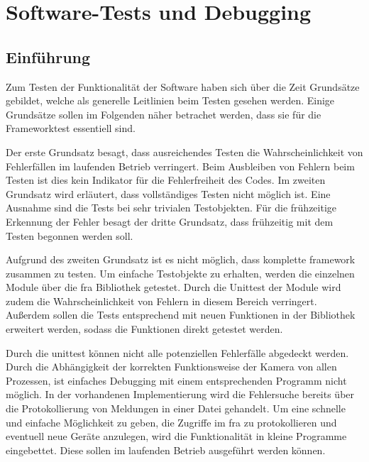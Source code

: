 
\chapter{Software-Tests und Debugging} \label{sec:test}

\section{Einführung}
Zum Testen der Funktionalität der Software haben sich über die Zeit Grundsätze gebildet, welche als generelle Leitlinien beim Testen gesehen werden. \citep[S. 53]{spillner2005basiswissen}
Einige Grundsätze sollen im Folgenden näher betrachet werden, dass sie für die Frameworktest essentiell sind. 

Der erste Grundsatz besagt, dass ausreichendes Testen die Wahrscheinlichkeit von Fehlerfällen im laufenden Betrieb verringert. Beim Ausbleiben von Fehlern beim Testen ist dies kein Indikator für die Fehlerfreiheit des Codes.
Im zweiten Grundsatz wird erläutert, dass vollständiges Testen nicht möglich ist. Eine Ausnahme sind die Tests bei sehr trivialen Testobjekten. 
Für die frühzeitige Erkennung der Fehler besagt der dritte Grundsatz, dass frühzeitig mit dem Testen begonnen werden soll. \citep[S. 53]{spillner2005basiswissen}


Aufgrund des zweiten Grundsatz ist es nicht möglich, dass komplette \gls{framework} zusammen zu testen. Um einfache Testobjekte zu erhalten, werden die einzelnen Module über die \ac{fra} Bibliothek getestet. Durch die Unittest der Module wird zudem die Wahrscheinlichkeit von Fehlern in diesem Bereich verringert. Außerdem sollen die Tests entsprechend mit neuen Funktionen in der Bibliothek erweitert werden, sodass die Funktionen direkt getestet werden.



Durch die \gls{unittest} können nicht alle potenziellen Fehlerfälle abgedeckt werden. Durch die Abhängigkeit der korrekten Funktionsweise der Kamera von allen Prozessen, ist einfaches Debugging mit einem entsprechenden Programm nicht möglich. In der vorhandenen Implementierung wird die Fehlersuche bereits über die Protokollierung von Meldungen in einer Datei gehandelt. Um eine schnelle und einfache Möglichkeit zu geben, die Zugriffe im \ac{fra} zu protokollieren und eventuell neue Geräte anzulegen, wird die Funktionalität in kleine Programme eingebettet. Diese sollen im laufenden Betrieb ausgeführt werden können. 




